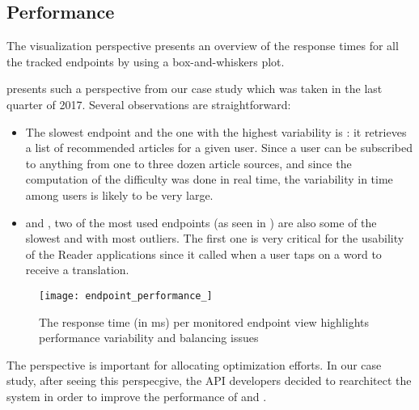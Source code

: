 
\subsection{Performance}
\label{sec:perf}

The  visualization perspective presents
an overview of the response times for all the tracked endpoints 
by using a box-and-whiskers plot. 

 presents such a perspective from our case study which 
was taken in the last quarter of 2017. Several observations are 
straightforward: 

\begin{itemize}

  \item The slowest endpoint and the one with the highest variability is \epFeedItemsColor: it retrieves a list of recommended articles for a given user. Since a user can be subscribed to anything from one to three dozen article sources, and since the computation of the difficulty was done in real time, the variability in time among users is likely to be very large. 

  \item \epTranslationsColor and \epBookmarksToStudyColor, two of the most used endpoints (as seen in ) are also some of the slowest and with most outliers. The first one is very critical for the usability of the Reader applications since it called when a user taps on a word to receive a translation.
 
\end{itemize}

\begin{figure}
 \centering
 \texttt{[image: endpoint\_performance\_]}
 \caption{The response time (in ms) per monitored endpoint view highlights performance variability and balancing issues}
 \label{fig:ep}
\end{figure}

The  perspective is important for allocating optimization efforts. In our case study, after seeing this perspecgive, the API developers decided to rearchitect the system in order to improve the performance of \epTranslations and \epFeedItems. 








